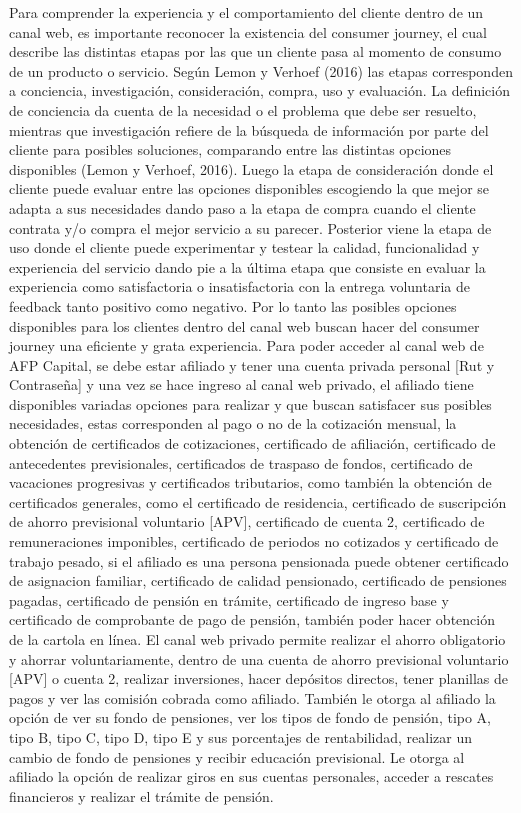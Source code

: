 Para comprender la experiencia y el comportamiento del cliente dentro de un canal web, es importante reconocer la existencia del consumer journey, el cual describe las distintas etapas por las que un cliente pasa al momento de consumo de un producto o servicio. Según Lemon y Verhoef (2016) las etapas corresponden a conciencia, investigación, consideración, compra, uso y evaluación. La definición de conciencia da cuenta de la necesidad o el problema que debe ser resuelto, mientras que investigación refiere de la búsqueda de información por parte del cliente para posibles soluciones, comparando entre las distintas opciones disponibles (Lemon y Verhoef, 2016). Luego la etapa de consideración donde el cliente puede evaluar entre las opciones disponibles escogiendo la que mejor se adapta a sus necesidades dando paso a la etapa de compra cuando el cliente contrata y/o compra el mejor servicio a su parecer. Posterior viene la etapa de uso donde el cliente puede experimentar y testear la calidad, funcionalidad y experiencia del servicio dando pie a la última etapa que consiste en evaluar la experiencia como satisfactoria o insatisfactoria con la entrega voluntaria de feedback tanto positivo como negativo. Por lo tanto las posibles opciones disponibles para los clientes dentro del canal web buscan hacer del consumer journey una eficiente y grata experiencia. 
Para poder acceder al canal web de AFP Capital, se debe estar afiliado y tener una cuenta privada personal [Rut y Contraseña] y una vez se hace ingreso al canal web privado, el afiliado tiene disponibles variadas opciones para realizar y que buscan satisfacer sus posibles necesidades, estas corresponden al pago o no de la cotización mensual, la obtención de certificados de cotizaciones, certificado de afiliación, certificado de antecedentes previsionales, certificados de traspaso de fondos, certificado de vacaciones progresivas y certificados tributarios, como también la obtención de certificados generales, como el certificado de residencia, certificado de suscripción de ahorro previsional voluntario [APV], certificado de cuenta 2, certificado de remuneraciones imponibles, certificado de periodos no cotizados y certificado de trabajo pesado, si el afiliado es una persona pensionada puede obtener certificado de asignacion familiar, certificado de calidad pensionado, certificado de pensiones pagadas, certificado de pensión en trámite, certificado de ingreso base y certificado de comprobante de pago de pensión, también poder hacer obtención de la cartola en línea. El canal web privado permite realizar el ahorro obligatorio y ahorrar voluntariamente, dentro de una cuenta de ahorro previsional voluntario [APV] o cuenta 2, realizar inversiones, hacer depósitos directos, tener planillas de pagos y ver las comisión cobrada como afiliado. También le otorga al afiliado la opción de ver su fondo de pensiones, ver los tipos de fondo de pensión, tipo A, tipo B, tipo C, tipo D, tipo E y sus porcentajes de rentabilidad, realizar un cambio de fondo de pensiones y recibir educación previsional. Le otorga al afiliado la opción de realizar giros en sus cuentas personales, acceder a rescates financieros y realizar el trámite de pensión. 

